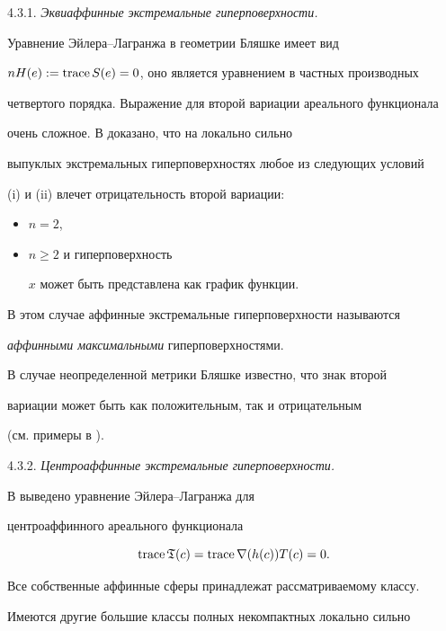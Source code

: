 \smallskip





4.3.1. {\it Эквиаффинные экстремальные гиперповерхности.}


Уравнение Эйлера--Лагранжа в геометрии Бляшке имеет вид


$nH(e):=\operatorname{trace} S(e)=0$, оно является уравнением в частных производных


четвертого порядка. Выражение для второй вариации ареального функционала 


очень сложное. В \cite{CAL-2} доказано, что на локально сильно 


выпуклых экстремальных гиперповерхностях любое из следующих условий


(i) и (ii) влечет отрицательность второй вариации:


\begin{itemize}


\item[(i)] $n=2$,


\item[(ii)] $n \geq 2$ и гиперповерхность


$x$ может быть представлена как график функции.


\end{itemize}


В этом случае аффинные экстремальные гиперповерхности называются


{\it аффинными максимальными} гиперповерхностями.


В случае неопределенной метрики Бляшке известно, что знак второй


вариации может быть как положительным, так и отрицательным


(см. примеры в \cite{V-V}).


\smallskip





4.3.2. {\it Центроаффинные экстремальные гиперповерхности.}


В \cite{WANG} выведено уравнение Эй\-ле\-ра--Ла\-гран\-жа для


центроаффинного ареального функционала


$$


\trace \frak{T}(c) =\trace \nabla (h(c)) T(c) = 0.


$$


Все собственные аффинные сферы принадлежат рассматриваемому классу.


Имеются другие большие классы полных некомпактных локально сильно



